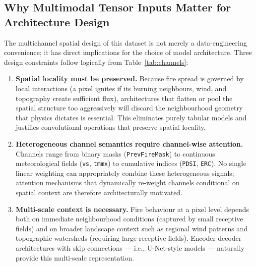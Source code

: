 
\subsection{Why Multimodal Tensor Inputs Matter for Architecture Design}

The multichannel spatial design of this dataset is not merely a data-engineering convenience; it has direct implications for the choice of model architecture.
Three design constraints follow logically from Table~\ref{tab:channels}:

\begin{enumerate}
    \item \textbf{Spatial locality must be preserved.}
          Because fire spread is governed by local interactions (a pixel ignites if its burning neighbours, wind, and topography create sufficient flux), architectures that flatten or pool the spatial structure too aggressively will discard the neighbourhood geometry that physics dictates is essential.
          This eliminates purely tabular models and justifies convolutional operations that preserve spatial locality.

    \item \textbf{Heterogeneous channel semantics require channel-wise attention.}
          Channels range from binary masks (\texttt{PrevFireMask}) to continuous meteorological fields (\texttt{vs}, \texttt{tmmx}) to cumulative indices (\texttt{PDSI}, \texttt{ERC}).
          No single linear weighting can appropriately combine these heterogeneous signals; attention mechanisms that dynamically re-weight channels conditional on spatial context are therefore architecturally motivated.

    \item \textbf{Multi-scale context is necessary.}
          Fire behaviour at a pixel level depends both on immediate neighbourhood conditions (captured by small receptive fields) and on broader landscape context such as regional wind patterns and topographic watersheds (requiring large receptive fields).
          Encoder-decoder architectures with skip connections — i.e., U-Net-style models — naturally provide this multi-scale representation.
\end{enumerate}

